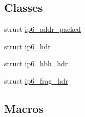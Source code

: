 \subsection*{Classes}
\begin{DoxyCompactItemize}
\item 
struct \hyperlink{structip6__addr__packed}{ip6\+\_\+addr\+\_\+packed}
\item 
struct \hyperlink{structip6__hdr}{ip6\+\_\+hdr}
\item 
struct \hyperlink{structip6__hbh__hdr}{ip6\+\_\+hbh\+\_\+hdr}
\item 
struct \hyperlink{structip6__frag__hdr}{ip6\+\_\+frag\+\_\+hdr}
\end{DoxyCompactItemize}
\subsection*{Macros}

